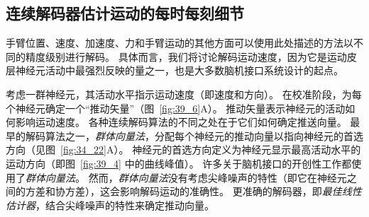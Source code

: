 \subsection{连续解码器估计运动的每时每刻细节}

手臂位置、速度、加速度、力和手臂运动的其他方面可以使用此处描述的方法以不同的精度级别进行解码。
具体而言，我们将讨论解码运动速度，因为它是运动皮层神经元活动中最强烈反映的量之一，也是大多数脑机接口系统设计的起点。


考虑一群神经元，其活动水平指示运动速度（即速度和方向）。
在校准阶段，为每个神经元确定一个“推动矢量”（图~\ref{fig:39_6}A）。
推动矢量表示神经元的活动如何影响运动速度。 各种连续解码算法的不同之处在于它们如何确定推送向量。
最早的解码算法之一，\textit{群体向量法}，分配每个神经元的推动向量以指向神经元的首选方向（见图~\ref{fig:34_22}A）。
神经元的首选方向定义为神经元显示最高活动水平的运动方向（即图~\ref{fig:39_4} 中的曲线峰值）。
许多关于脑机接口的开创性工作都使用了\textit{群体向量法}。
然而，\textit{群体向量法}没有考虑尖峰噪声的特性（即它在神经元之间的方差和协方差），这会影响解码运动的准确性。
更准确的解码器，即\textit{最佳线性估计器}，结合尖峰噪声的特性来确定推动向量。


